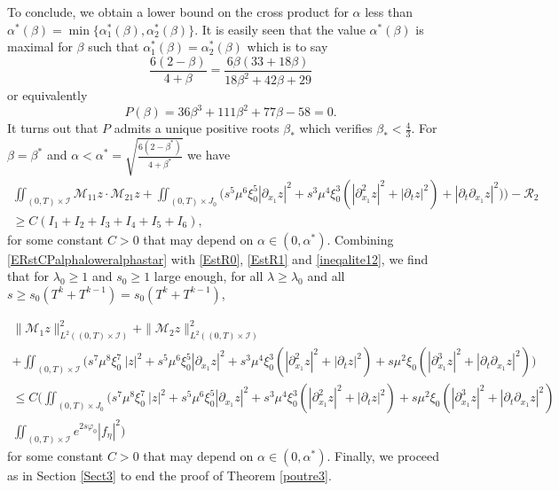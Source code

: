 \documentclass[a4paper, 12pt]{article}
\theoremstyle{plain}
\theoremstyle{definition}
\numberwithin{theorem}{section}
\numberwithin{equation}{section}
\begin{document}
{To conclude, we obtain a lower bound on the cross product for $\alpha$ less than $\alpha^*(\beta)=\min\{\alpha_1^*(\beta),\alpha_2^*(\beta)\}$. It is easily seen that the value $\alpha^*(\beta)$ is maximal for $\beta$ such that $\alpha_1^*(\beta)=\alpha_2^*(\beta)$ which is to say
$$
\frac{6(2-\beta)}{4+\beta}=\frac{6\beta(33+18\beta)}{18\beta^2+42\beta+29}
$$
or equivalently
$$
P(\beta) = 36\beta^3+111\beta^2+77\beta-58=0.
$$
It turns out that $P$ admits a unique positive roots $\beta_*$ which verifies $\beta_* < \frac{4}{3}$.
For $\beta=\beta^*$  and $\alpha<\alpha^*=\sqrt{\frac{6(2-\beta^*)}{4+\beta^*}}$ we have
\begin{multline}\label{ERstCPalphaloweralphastar}
\iint_{(0,T)\times\mathcal{I}}\mathcal{M}_{11} z\cdot \mathcal{M}_{21} z+\iint_{(0,T)\times J_0}\Big(s^5\mu^6\xi_0^5|\partial_{x_1}z|^2+s^3\mu^4\xi_0^3(|\partial^2_{x_1}z|^2+|\partial_tz|^2)+|\partial_t\partial_{x_1}z|^2)\Big)-\mathcal{R}_2\\
\geq C( I_1+ I_2+ I_3+ I_4+ I_5+I_6),
\end{multline}
for some constant $C>0$ that may depend on $\alpha\in (0,\alpha^*)$.
Combining \eqref{ERstCPalphaloweralphastar} with \eqref{EstR0}, \eqref{EstR1} and \eqref{ineqalite12}, we find that for $\lambda_0\geq 1$ and $s_0\geq 1 $ large enough, for all $\lambda\geq\lambda_0$ and all $s\geq s_0(T^k+T^{k-1})=s_0(T^k+T^{k-1})$, 

\begin{multline}\label{midle-estimateBis}
\|\mathcal{M}_1z\|^2_{L^2((0,T)\times\mathcal{I})}+\|\mathcal{M}_2z\|^2_{L^2((0,T)\times\mathcal{I})}\\
+ \iint_{(0,T)\times\mathcal{I}}\Big(s^7\mu^8\xi^7_0~|z|^2+s^5\mu^6\xi_0^5|\partial_{x_1}z|^2+s^3\mu^4\xi_0^3(|\partial^2_{x_1}z|^2+|\partial_tz|^2)  +s\mu^2\xi_0(|\partial^3_{x_1}z|^2+|\partial_t\partial_{x_1}z|^2)\Big)\\
\leq C \Big(\iint_{(0,T)\times J_0}\Big(s^7\mu^8\xi^7_0~|z|^2+s^5\mu^6\xi_0^5|\partial_{x_1}z|^2+s^3\mu^4\xi_0^3(|\partial^2_{x_1}z|^2+|\partial_tz|^2)+s\mu^2\xi_0(|\partial^3_{x_1}z|^2+|\partial_t\partial_{x_1}z|^2)\\
\iint_{(0,T)\times\mathcal{I}}e^{2s\varphi_0}|f_\eta|^2\Big)
\end{multline}
for some constant $C>0$ that may depend on $\alpha\in (0,\alpha^*)$. Finally, we proceed as in Section \ref{Sect3} to end the proof of Theorem \ref{poutre3}.




}
\end{document}
